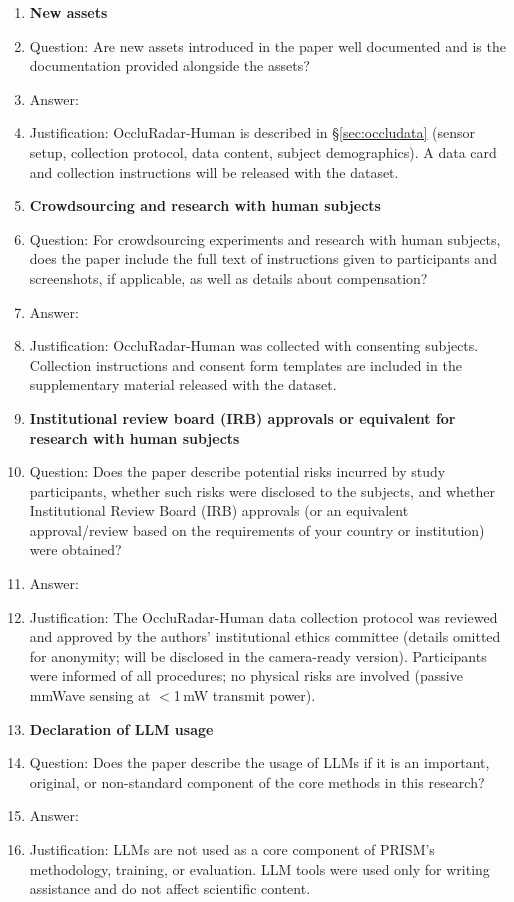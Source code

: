 \begin{enumerate}
\item {\bf New assets}
    \item[] Question: Are new assets introduced in the paper well documented and is the documentation provided alongside the assets?
    \item[] Answer: \answerYes{}
    \item[] Justification: OccluRadar-Human is described in \S\ref{sec:occludata} (sensor setup, collection protocol, data content, subject demographics). A data card and collection instructions will be released with the dataset.

\item {\bf Crowdsourcing and research with human subjects}
    \item[] Question: For crowdsourcing experiments and research with human subjects, does the paper include the full text of instructions given to participants and screenshots, if applicable, as well as details about compensation?
    \item[] Answer: \answerYes{}
    \item[] Justification: OccluRadar-Human was collected with consenting subjects. Collection instructions and consent form templates are included in the supplementary material released with the dataset.

\item {\bf Institutional review board (IRB) approvals or equivalent for research with human subjects}
    \item[] Question: Does the paper describe potential risks incurred by study participants, whether such risks were disclosed to the subjects, and whether Institutional Review Board (IRB) approvals (or an equivalent approval/review based on the requirements of your country or institution) were obtained?
    \item[] Answer: \answerYes{}
    \item[] Justification: The OccluRadar-Human data collection protocol was reviewed and approved by the authors' institutional ethics committee (details omitted for anonymity; will be disclosed in the camera-ready version). Participants were informed of all procedures; no physical risks are involved (passive mmWave sensing at $<$1\,mW transmit power).

\item {\bf Declaration of LLM usage}
    \item[] Question: Does the paper describe the usage of LLMs if it is an important, original, or non-standard component of the core methods in this research?
    \item[] Answer: \answerNA{}
    \item[] Justification: LLMs are not used as a core component of PRISM's methodology, training, or evaluation. LLM tools were used only for writing assistance and do not affect scientific content.

\end{enumerate}
